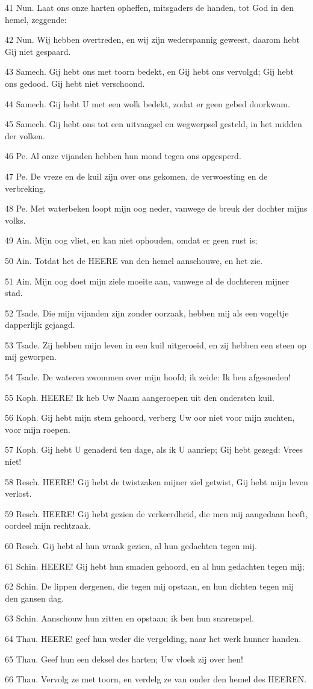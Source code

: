 \par 41 Nun. Laat ons onze harten opheffen, mitsgaders de handen, tot God in den hemel, zeggende:
\par 42 Nun. Wij hebben overtreden, en wij zijn wederspannig geweest, daarom hebt Gij niet gespaard.
\par 43 Samech. Gij hebt ons met toorn bedekt, en Gij hebt ons vervolgd; Gij hebt ons gedood. Gij hebt niet verschoond.
\par 44 Samech. Gij hebt U met een wolk bedekt, zodat er geen gebed doorkwam.
\par 45 Samech. Gij hebt ons tot een uitvaagsel en wegwerpsel gesteld, in het midden der volken.
\par 46 Pe. Al onze vijanden hebben hun mond tegen ons opgesperd.
\par 47 Pe. De vreze en de kuil zijn over ons gekomen, de verwoesting en de verbreking.
\par 48 Pe. Met waterbeken loopt mijn oog neder, vanwege de breuk der dochter mijns volks.
\par 49 Ain. Mijn oog vliet, en kan niet ophouden, omdat er geen rust is;
\par 50 Ain. Totdat het de HEERE van den hemel aanschouwe, en het zie.
\par 51 Ain. Mijn oog doet mijn ziele moeite aan, vanwege al de dochteren mijner stad.
\par 52 Tsade. Die mijn vijanden zijn zonder oorzaak, hebben mij als een vogeltje dapperlijk gejaagd.
\par 53 Tsade. Zij hebben mijn leven in een kuil uitgeroeid, en zij hebben een steen op mij geworpen.
\par 54 Tsade. De wateren zwommen over mijn hoofd; ik zeide: Ik ben afgesneden!
\par 55 Koph. HEERE! Ik heb Uw Naam aangeroepen uit den ondersten kuil.
\par 56 Koph. Gij hebt mijn stem gehoord, verberg Uw oor niet voor mijn zuchten, voor mijn roepen.
\par 57 Koph. Gij hebt U genaderd ten dage, als ik U aanriep; Gij hebt gezegd: Vrees niet!
\par 58 Resch. HEERE! Gij hebt de twistzaken mijner ziel getwist, Gij hebt mijn leven verlost.
\par 59 Resch. HEERE! Gij hebt gezien de verkeerdheid, die men mij aangedaan heeft, oordeel mijn rechtzaak.
\par 60 Resch. Gij hebt al hun wraak gezien, al hun gedachten tegen mij.
\par 61 Schin. HEERE! Gij hebt hun smaden gehoord, en al hun gedachten tegen mij;
\par 62 Schin. De lippen dergenen, die tegen mij opstaan, en hun dichten tegen mij den gansen dag.
\par 63 Schin. Aanschouw hun zitten en opstaan; ik ben hun snarenspel.
\par 64 Thau. HEERE! geef hun weder die vergelding, naar het werk hunner handen.
\par 65 Thau. Geef hun een deksel des harten; Uw vloek zij over hen!
\par 66 Thau. Vervolg ze met toorn, en verdelg ze van onder den hemel des HEEREN.

